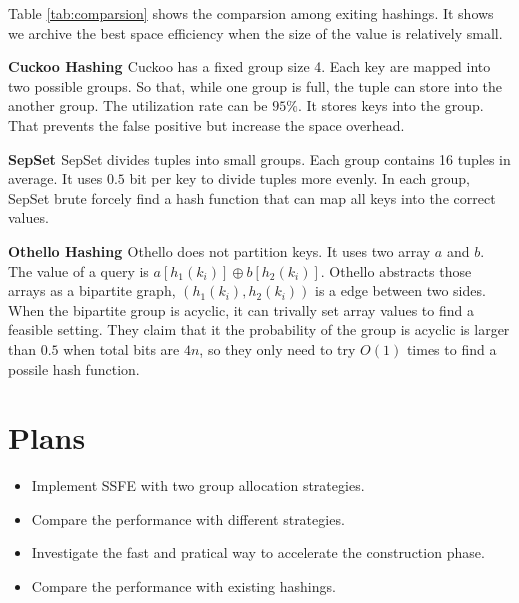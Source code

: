 \documentclass{article}
\begin{document}
Table \ref{tab:comparsion} shows the comparsion among exiting hashings. It shows we archive the best space efficiency when the size of the value is relatively small.

\textbf{Cuckoo Hashing \cite{zhou2013scalable}} Cuckoo has a fixed group size 4. Each key are mapped into two possible groups. So that, while one group is full, the tuple can store into the another group. The utilization rate can be $95\%$. It stores keys into the group. That prevents the false positive but increase the space overhead.

\textbf{SepSet \cite{zhou2015scaling}} SepSet divides tuples into small groups. Each group contains 16 tuples in average. It uses $0.5$ bit per key to divide tuples more evenly. In each group, SepSet brute forcely find a hash function that can map all keys into the correct values. 

\textbf{Othello Hashing \cite{yu2018memory}} Othello does not partition keys. It uses two array $a$ and $b$. The value of a query is $a[h_1(k_i)] \oplus b[h_2(k_i)]$. Othello abstracts those arrays as a bipartite graph, $(h_1(k_i), h_2(k_i))$ is a edge between two sides. When the bipartite group is acyclic, it can trivally set array values to find a feasible setting. They claim that it the probability of the group is acyclic is larger than $0.5$ when total bits are $4n$, so they only need to try $O(1)$ times to find a possile hash function.

\section{Plans}

\begin{itemize}
    \item Implement SSFE with two group allocation strategies.
    \item Compare the performance with different strategies.
    \item Investigate the fast and pratical way to accelerate the construction phase.
    \item Compare the performance with existing hashings.
\end{itemize}



\end{document}
